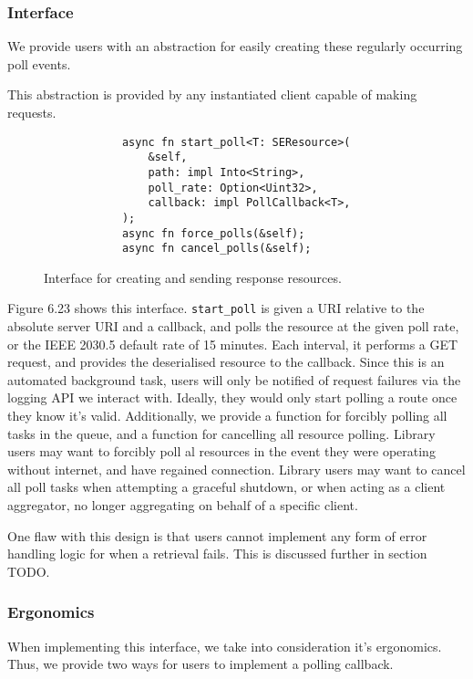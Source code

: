 \subsubsection{Interface}
We provide users with an abstraction for easily creating these regularly occurring poll events.

This abstraction is provided by any instantiated client capable of making requests.

\begin{figure}[h]
    \begin{center}
        \begin{lstlisting}
            async fn start_poll<T: SEResource>(
                &self,
                path: impl Into<String>,
                poll_rate: Option<Uint32>,
                callback: impl PollCallback<T>,
            );
            async fn force_polls(&self);
            async fn cancel_polls(&self);
        \end{lstlisting}
        \label{fig:pollinterface}
        \vspace{-10pt}
        \caption{Interface for creating and sending response resources.}
    \end{center}
\end{figure}

Figure 6.23 shows this interface. \texttt{start\_poll} is given a URI relative to the absolute server URI and a callback, and polls the resource at the given poll rate, or the IEEE 2030.5 default rate of 15 minutes. Each interval, it performs a GET request, and provides the deserialised resource to the callback. Since this is an automated background task, users will only be notified of request failures via the logging API we interact with. Ideally, they would only start polling a route once they know it's valid.
Additionally, we provide a function for forcibly polling all tasks in the queue, and a function for cancelling all resource polling. Library users may want to forcibly poll al resources in the event they were operating without internet, and have regained connection. Library users may want to cancel all poll tasks when attempting a graceful shutdown, or when acting as a client aggregator, no longer aggregating on behalf of a specific client. 

One flaw with this design is that users cannot implement any form of error handling logic for when a retrieval fails. This is discussed further in section TODO.

\subsubsection{Ergonomics}
When implementing this interface, we take into consideration it's ergonomics. Thus, we provide two ways for users to implement a polling callback.


